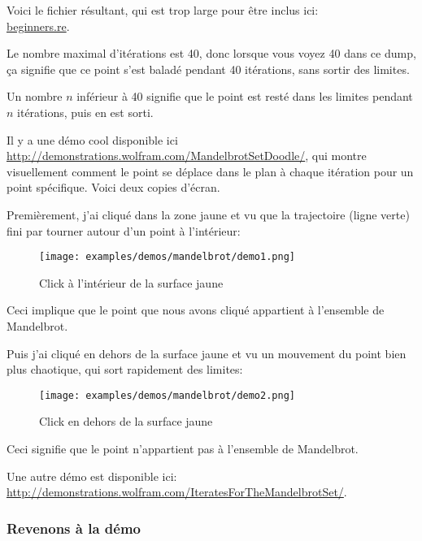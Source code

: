 

Voici le fichier résultant, qui est trop large pour être inclus ici:\\
\href{http://beginners.re/examples/mandelbrot/result.txt}{beginners.re}.

Le nombre maximal d'itérations est 40, donc lorsque vous voyez 40 dans ce dump, ça
signifie que ce point s'est baladé pendant 40 itérations, sans sortir des limites.

Un nombre $n$ inférieur à 40 signifie que le point est resté dans les limites pendant
$n$ itérations, puis en est sorti.

\clearpage
Il y a une démo cool disponible ici \url{http://demonstrations.wolfram.com/MandelbrotSetDoodle/}, qui montre
visuellement comment le point se déplace dans le plan à chaque itération pour un
point spécifique.
Voici deux copies d'écran.

%
Premièrement, j'ai cliqué dans la zone jaune et vu que la trajectoire (ligne verte)
fini par tourner autour d'un point à l'intérieur:

\begin{figure}[H]
\centering
\texttt{[image: examples/demos/mandelbrot/demo1.png]}
\caption{Click à l'intérieur de la surface jaune}
\end{figure}


Ceci implique que le point que nous avons cliqué appartient à l'ensemble de Mandelbrot.

\clearpage

Puis j'ai cliqué en dehors de la surface jaune et vu un mouvement du point bien plus
chaotique, qui sort rapidement des limites:

\begin{figure}[H]
\centering
\texttt{[image: examples/demos/mandelbrot/demo2.png]}
\caption{Click en dehors de la surface jaune}
\end{figure}

Ceci signifie que le point n'appartient pas à l'ensemble de Mandelbrot.

Une autre démo est disponible ici:\\
\url{http://demonstrations.wolfram.com/IteratesForTheMandelbrotSet/}.

\clearpage
\subsubsection{Revenons à la démo}


